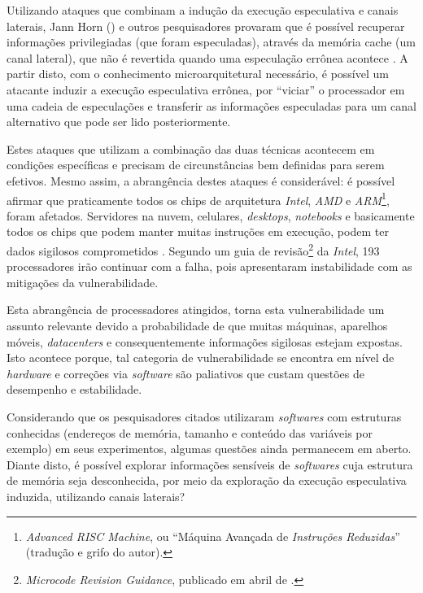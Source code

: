 \documentclass[
	article,			    %
	12pt,				    %
	oneside,			    %
	a4paper,			    %
	chapter=TITLE,		    %
	section=TITLE,		    %
	subsection=TITLE,	    %
	english,			    %
	brazil,				    %
	sumario=tradicional
]{abntex2}
\begin{document}
Utilizando ataques que combinam a indução da execução especulativa e canais laterais, Jann Horn (\citeyear{Jann2018Reading}) e outros pesquisadores provaram que é possível recuperar informações privilegiadas (que foram especuladas), através da memória cache (um canal lateral), que não é revertida quando uma especulação errônea acontece \cite{Kocher2018Spectre}. A partir disto, com o conhecimento microarquitetural necessário, é possível um atacante induzir a execução especulativa errônea, por ``viciar'' o processador em uma cadeia de especulações e transferir as informações especuladas para um canal alternativo que pode ser lido posteriormente.

Estes ataques que utilizam a combinação das duas técnicas acontecem em condições específicas e precisam de circunstâncias bem definidas para serem efetivos. Mesmo assim, a abrangência destes ataques é considerável: é possível afirmar que praticamente todos os chips de arquitetura \emph{Intel}, \emph{AMD} e \emph{ARM}\footnote{\emph{Advanced RISC Machine}, ou ``Máquina Avançada de \emph{Instruções Reduzidas}'' (tradução e grifo do autor).}, foram afetados. Servidores na nuvem, celulares, \emph{desktops}, \emph{notebooks} e basicamente todos os chips que podem manter muitas instruções em execução, podem ter dados sigilosos comprometidos \cite{Graz2018Meltdown}. Segundo um guia de revisão\footnote{\emph{Microcode Revision Guidance}, publicado em abril de \citeyear{Intel2018Microcode}.} da \emph{Intel}, 193 processadores irão continuar com a falha, pois apresentaram instabilidade com as mitigações da vulnerabilidade.

Esta abrangência de processadores atingidos, torna esta vulnerabilidade um assunto relevante devido a probabilidade de que muitas máquinas, aparelhos móveis, \emph{datacenters} e consequentemente informações sigilosas estejam expostas. Isto acontece porque, tal categoria de vulnerabilidade se encontra em nível de \emph{hardware} e correções via \emph{software} são paliativos que custam questões de desempenho e estabilidade.

Considerando que os pesquisadores citados utilizaram \emph{softwares} com estruturas conhecidas (endereços de memória, tamanho e conteúdo das variáveis por exemplo) em seus experimentos, algumas questões ainda permanecem em aberto. Diante disto, é possível explorar informações sensíveis de \emph{softwares} cuja estrutura de memória seja desconhecida, por meio da exploração da execução especulativa induzida, utilizando canais laterais?
\end{document}
